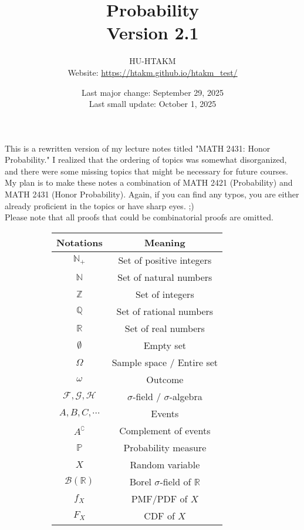 \documentclass{huhtakm-template-book-v2}
\title{
	\Huge Probability\\
	\small Version 2.1
}
\author{
	HU-HTAKM\\
	\small Website: \url{https://htakm.github.io/htakm_test/}
}
\date{
	Last major change: September 29, 2025\\
	Last small update: October 1, 2025
}
\newcommand{\prob}{\mathbb{P}}
\begin{document}
\maketitle

    This is a rewritten version of my lecture notes titled "MATH 2431: Honor Probability." I realized that the ordering of topics was somewhat disorganized, and there were some missing topics that might be necessary for future courses.\\
    My plan is to make these notes a combination of MATH 2421 (Probability) and MATH 2431 (Honor Probability). Again, if you can find any typos, you are either already proficient in the topics or have sharp eyes. ;)\\
    Please note that all proofs that could be combinatorial proofs are omitted.
    \begin{figure}[h]
        \begin{subfigure}[h]{0.45\textwidth}
            \centering
            \begin{tabular}{cc}
                Notations & Meaning\\
                \hline
                $\mathbb{N}_{+}$ & Set of positive integers\\
                $\mathbb{N}$ & Set of natural numbers\\
                $\mathbb{Z}$ & Set of integers\\
                $\mathbb{Q}$ & Set of rational numbers\\
                $\mathbb{R}$ & Set of real numbers\\
                $\emptyset$ & Empty set\\
                $\Omega$ & Sample space / Entire set\\
                $\omega$ & Outcome\\
                $\mathcal{F},\mathcal{G},\mathcal{H}$ & $\sigma$-field / $\sigma$-algebra\\
                $A,B,C,\cdots$ & Events\\
                $A^{\complement}$ & Complement of events\\
                $\prob$ & Probability measure\\
                $X$ & Random variable\\
                $\mathcal{B}(\mathbb{R})$ & Borel $\sigma$-field of $\mathbb{R}$ \\
                $f_{X}$ & PMF/PDF of $X$\\
                $F_{X}$ & CDF of $X$\\

\end{tabular}
\end{subfigure}
\end{figure}
\end{document}
